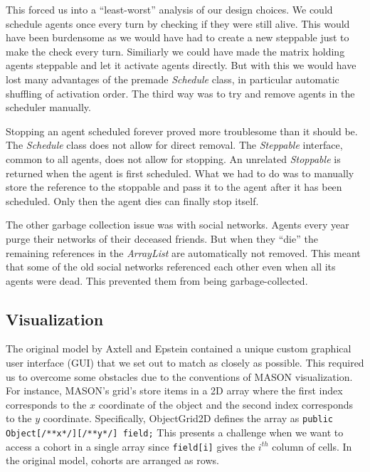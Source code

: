 \documentclass[runningheads,a4paper]{llncs}
\begin{document}
This forced us into a ``least-worst'' analysis of our design choices.
We could schedule agents once every turn by checking if they were still alive.
This would have been burdensome as we would have had to create a new steppable just to make the check every turn.
Similiarly we could have made the matrix holding agents steppable and let it activate agents directly.
But with this we would have lost many advantages of the premade \textit{Schedule} class, in particular automatic shuffling of activation order.
The third way was to try and remove agents in the scheduler manually.

Stopping an agent scheduled forever proved more troublesome than it should be.
The \textit{Schedule} class does not allow for direct removal. 
The \textit{Steppable} interface, common to all agents, does not allow for stopping.
An unrelated \textit{Stoppable} is returned when the agent is first scheduled.
What we had to do was to manually store the reference to the stoppable and pass it to the agent after it has been scheduled.
Only then the agent dies can finally stop itself.

The other garbage collection issue was with social networks.
Agents every year purge their networks of their deceased friends. 
But when they ``die'' the remaining references in the \textit{ArrayList} are automatically not removed.
This meant that some of the old social networks referenced each other even when all its agents were dead.
This prevented them from being garbage-collected.


\subsection{Visualization}

The original model by Axtell and Epstein contained a unique custom graphical user interface (GUI) that we set out to match as closely as possible. 
This required us to overcome some obstacles due to the conventions of MASON visualization. 
For instance, MASON's grid's store items in a 2D array where the first index corresponds to the $x$ coordinate of the object and the second index corresponds to the $y$ coordinate. 
Specifically, ObjectGrid2D defines the array as \lstinline!public Object[/**x*/][/**y*/] field;! This presents a challenge when we want to access a cohort in a single array since \lstinline!field[i]! gives the $i^{th}$ column of cells. In the original model, cohorts are arranged as rows.
\end{document}
